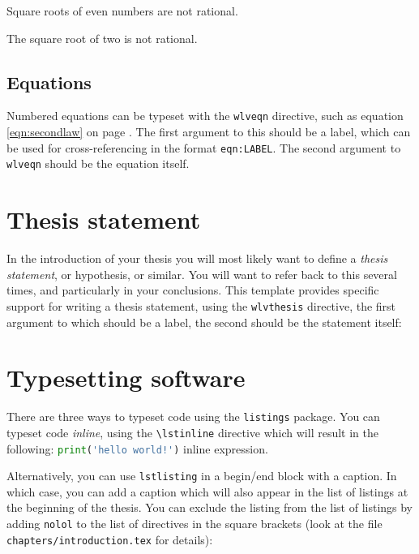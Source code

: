 \begin{theorem}
\label{thm:evens}
Square roots of even numbers are not rational.
\end{theorem}

\begin{lemma}
\label{thm:two}
The square root of two is not rational.
\end{lemma}

\subsection{Equations}

Numbered equations can be typeset with the \verb!wlveqn! directive,
such as equation \ref{eqn:secondlaw} on page
\pageref{eqn:secondlaw}. The first argument to this should be a label,
which can be used for cross-referencing in the format
\verb!eqn:LABEL!. The second argument to \verb!wlveqn! should be the
equation itself.



\section{Thesis statement}


In the introduction of your thesis you will most likely want to define
a \emph{thesis statement}, or hypothesis, or similar. You will want to
refer back to this several times, and particularly in your
conclusions. This template provides specific support for writing a
thesis statement, using the \verb!wlvthesis! directive, the first
argument to which should be a label, the second should be the
statement itself:



\section{Typesetting software}

There are three ways to typeset code using the \verb!listings!
  package. You can typeset code \emph{inline}, using the
  \verb!\lstinline! directive which will result in the following:
  \lstinline[language=Python]$print('hello world!')$ inline
  expression.

Alternatively, you can use \verb!lstlisting! in a begin/end block with
a caption. In which case, you can add a caption which will also appear
in the list of listings at the beginning of the thesis. You can
exclude the listing from the list of listings by adding \verb!nolol!
to the list of directives in the square brackets (look at the file 
\verb!chapters/introduction.tex! for details):

